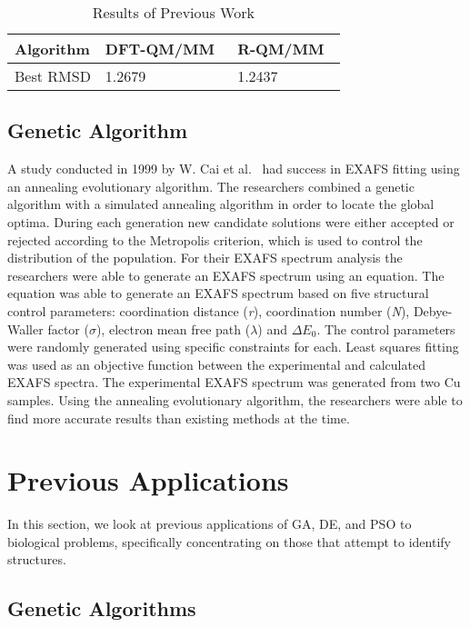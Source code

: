 \begin{table}
	\centering
	\begin{tabular}{ | l | l | l | }
		\hline
		Algorithm & DFT-QM/MM~\cite{luber2011s1} & R-QM/MM~\cite{luber2011s1} \\ \hline
		Best RMSD & 1.2679 & 1.2437 \\ \hline
	\end{tabular}
	\caption{Results of Previous Work}
	\label{fig:previous-work-rmsd}
\end{table}

\subsection{Genetic Algorithm}

A study conducted in 1999 by W. Cai et al.~\cite{cai1999analysis} had success in EXAFS fitting using an annealing evolutionary algorithm. The researchers combined a genetic algorithm with a simulated annealing algorithm in order to locate the global optima. During each generation new candidate solutions were either accepted or rejected according to the Metropolis criterion, which is used to control the distribution of the population. For their EXAFS spectrum analysis the researchers were able to generate an EXAFS spectrum using an equation. The equation was able to generate an EXAFS spectrum based on five structural control parameters: coordination distance (\textit{r}), coordination number (\textit{N}), Debye-Waller factor ($\sigma$), electron mean free path ($\lambda$) and $\Delta{E_{0}}$. The control parameters were randomly generated using specific constraints for each. Least squares fitting was used as an objective function between the experimental and calculated EXAFS spectra. The experimental EXAFS spectrum was generated from two Cu samples. Using the annealing evolutionary algorithm, the researchers were able to find more accurate results than existing methods at the time.

\section{Previous Applications}
\label{sec:prev-app}

In this section, we look at previous applications of GA, DE, and PSO to biological problems, specifically concentrating on those that attempt to identify structures.

\subsection{Genetic Algorithms}

